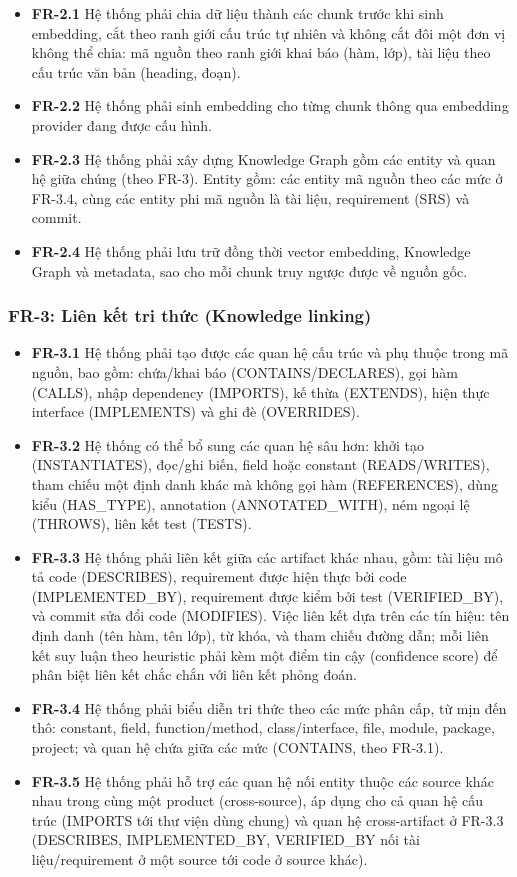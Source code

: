 \begin{itemize}
  \item \textbf{FR-2.1} Hệ thống phải chia dữ liệu thành các chunk trước khi sinh embedding, cắt theo ranh giới cấu trúc tự nhiên và không cắt đôi một đơn vị không thể chia: mã nguồn theo ranh giới khai báo (hàm, lớp), tài liệu theo cấu trúc văn bản (heading, đoạn).
  \item \textbf{FR-2.2} Hệ thống phải sinh embedding cho từng chunk thông qua embedding provider đang được cấu hình.
  \item \textbf{FR-2.3} Hệ thống phải xây dựng Knowledge Graph gồm các entity và quan hệ giữa chúng (theo FR-3). Entity gồm: các entity mã nguồn theo các mức ở FR-3.4, cùng các entity phi mã nguồn là tài liệu, requirement (SRS) và commit.
  \item \textbf{FR-2.4} Hệ thống phải lưu trữ đồng thời vector embedding, Knowledge Graph và metadata, sao cho mỗi chunk truy ngược được về nguồn gốc.
\end{itemize}

\subsubsection*{FR-3: Liên kết tri thức (Knowledge linking)}

\begin{itemize}
  \item \textbf{FR-3.1} Hệ thống phải tạo được các quan hệ cấu trúc và phụ thuộc trong mã nguồn, bao gồm: chứa/khai báo (CONTAINS/DECLARES), gọi hàm (CALLS), nhập dependency (IMPORTS), kế thừa (EXTENDS), hiện thực interface (IMPLEMENTS) và ghi đè (OVERRIDES).
  \item \textbf{FR-3.2} Hệ thống có thể bổ sung các quan hệ sâu hơn: khởi tạo (INSTANTIATES), đọc/ghi biến, field hoặc constant (READS/WRITES), tham chiếu một định danh khác mà không gọi hàm (REFERENCES), dùng kiểu (HAS\_TYPE), annotation (ANNOTATED\_WITH), ném ngoại lệ (THROWS), liên kết test (TESTS).
  \item \textbf{FR-3.3} Hệ thống phải liên kết giữa các artifact khác nhau, gồm: tài liệu mô tả code (DESCRIBES), requirement được hiện thực bởi code (IMPLEMENTED\_BY), requirement được kiểm bởi test (VERIFIED\_BY), và commit sửa đổi code (MODIFIES). Việc liên kết dựa trên các tín hiệu: tên định danh (tên hàm, tên lớp), từ khóa, và tham chiếu đường dẫn; mỗi liên kết suy luận theo heuristic phải kèm một điểm tin cậy (confidence score) để phân biệt liên kết chắc chắn với liên kết phỏng đoán.
  \item \textbf{FR-3.4} Hệ thống phải biểu diễn tri thức theo các mức phân cấp, từ mịn đến thô: constant, field, function/method, class/interface, file, module, package, project; và quan hệ chứa giữa các mức (CONTAINS, theo FR-3.1).
  \item \textbf{FR-3.5} Hệ thống phải hỗ trợ các quan hệ nối entity thuộc các source khác nhau trong cùng một product (cross-source), áp dụng cho cả quan hệ cấu trúc (IMPORTS tới thư viện dùng chung) và quan hệ cross-artifact ở FR-3.3 (DESCRIBES, IMPLEMENTED\_BY, VERIFIED\_BY nối tài liệu/requirement ở một source tới code ở source khác).
\end{itemize}

